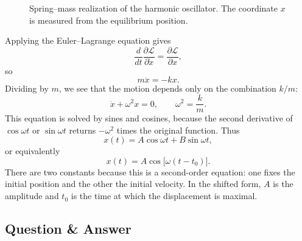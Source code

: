 \begin{figure}[h]
\centering
{}
\caption{Spring--mass realization of the harmonic oscillator. The coordinate \(x\) is measured from the equilibrium position.}
\end{figure}

Applying the Euler--Lagrange equation gives
\begin{equation}
\frac{d}{dt}\frac{\partial\mathcal{L}}{\partial\dot x}
=
\frac{\partial\mathcal{L}}{\partial x},
\end{equation}
so
\begin{equation}
m\ddot x=-kx.
\end{equation}
Dividing by \(m\), we see that the motion depends only on the combination \(k/m\):
\begin{equation}
\ddot x+\omega^2 x=0,
\qquad
\omega^2=\frac{k}{m}.
\end{equation}
This equation is solved by sines and cosines, because the second derivative of \(\cos\omega t\) or \(\sin\omega t\) returns \(-\omega^2\) times the original function. Thus
\begin{equation}
x(t)=A\cos\omega t+B\sin\omega t,
\end{equation}
or equivalently
\begin{equation}
x(t)=A\cos\bigl[\omega(t-t_0)\bigr].
\end{equation}
There are two constants because this is a second-order equation: one fixes the initial position and the other the initial velocity. In the shifted form, \(A\) is the amplitude and \(t_0\) is the time at which the displacement is maximal.

\subsection{Question \& Answer}

